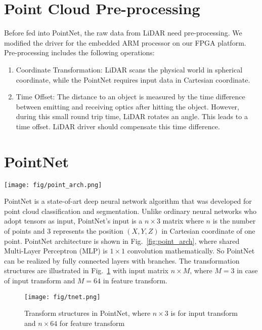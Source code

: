 \documentclass[conference]{IEEEtran}
\begin{document}
\section{Point Cloud Pre-processing}\label{sec:driver}
Before fed into PointNet, the raw data from LiDAR need pre-processing. We modified the driver for the embedded ARM processor on our FPGA platform. Pre-processing includes the following operations:
\begin{enumerate}
    \item Coordinate Transformation: LiDAR scans the physical world in spherical coordinate, while the PointNet requires input data in Cartesian coordinate.
    \item Time Offset: The distance to an object is measured by the time difference between emitting and receiving optics after hitting the object. However, during this small round trip time, LiDAR rotates an angle. This leads to a time offset. LiDAR driver should compensate this time difference.
\end{enumerate}

\section{PointNet}\label{sec:pointnet}

\begin{figure*}
    \centering
    \texttt{[image: fig/point\_arch.png]}
    \caption{PointNet for point cloud classification and segmentation}
    \label{fig:point_arch}
\end{figure*}

PointNet \cite{qi2017pointnet} is a state-of-art deep neural network algorithm that was developed for point cloud classification and segmentation. Unlike ordinary neural networks who adopt tensors as input, PointNet's input is a $n\times 3$ matrix where $n$ is the number of points and $3$ represents the position $(X,Y,Z)$ in Cartesian coordinate of one point. PointNet architecture is shown in Fig.~\ref{fig:point_arch}, where shared Multi-Layer Perceptron (MLP) is $1\times 1$ convolution mathematically. So PointNet can be realized by fully connected layers with branches. The transformation structures are illustrated in Fig.~\ref{fig:tnet} with input matrix $n\times M$, where $M=3$ in case of input transform and $M=64$ in feature transform.

\begin{figure}[htbp]
    \centering
    \texttt{[image: fig/tnet.png]}
    \caption{Transform structures in PointNet, where $n\times 3$ is for input transform and $n\times 64$ for feature transform}
    \label{fig:tnet}
\end{figure}
\end{document}
